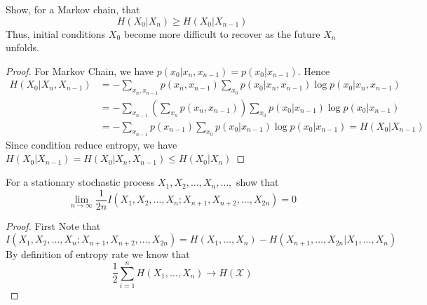 \begin{exercise}{ Show, for a Markov chain, that
  $$
  H\left(X_{0} | X_{n}\right) \geq H\left(X_{0} | X_{n-1}\right)
  $$
  Thus, initial conditions $X_{0}$ become more difficult to recover as the future $X_{n}$ unfolds.}
  \begin{proof}
  For Markov Chain, we have $p(x_0|x_n,x_{n-1}) = p(x_0|x_{n-1})$. Hence
  \begin{equation}
    \begin{aligned}
      H(X_0|X_n,X_{n-1}) &= -\sum_{x_n,x_{n-1}} p(x_n,x_{n-1}) \sum_{x_0} p(x_0|x_n,x_{n-1}) \log    p(x_0|x_n,x_{n-1}) \\
      &= -\sum_{x_{n-1}} \left( \sum_{x_{n}} p(x_n,x_{n-1}) \right) \sum_{x_0} p(x_0|x_{n-1}) \log    p(x_0|x_{n-1})\\
      &= -\sum_{x_{n-1}} p(x_{n-1}) \sum_{x_0} p(x_0|x_{n-1}) \log    p(x_0|x_{n-1}) = H(X_0|X_{n-1})
    \end{aligned}
  \end{equation}
  Since condition reduce entropy, we have $  H(X_0|X_{n-1}) = H(X_0|X_n,X_{n-1}) \le  H(X_0|X_n) $
  \end{proof}
  \label{ex2}
\end{exercise}

\begin{exercise}{For a stationary stochastic process $X_{1}, X_{2}, \ldots, X_{n}, \ldots,$ show that
  $$
  \lim _{n \rightarrow \infty} \frac{1}{2 n} I\left(X_{1}, X_{2}, \ldots, X_{n} ; X_{n+1}, X_{n+2}, \ldots, X_{2 n}\right)=0
  $$}
  \begin{proof} First Note that
    \begin{equation}
      I\left(X_{1}, X_{2}, \ldots, X_{n} ; X_{n+1}, X_{n+2}, \ldots, X_{2 n}\right) = H(X_1,\ldots,X_n) - H(X_{n+1},\ldots,X_{2n}|X_1,\ldots,X_n)
    \end{equation}
    By definition of entropy rate we know that $$\frac{1}{2}\sum_{i=1}^{n} H(X_1,\ldots,X_n) \rightarrow H(\mathcal{X})$$



  \end{proof}
  \label{ex3}
\end{exercise}



